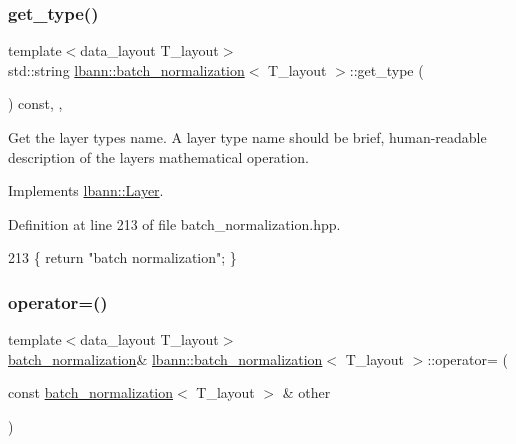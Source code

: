 \subsubsection{\texorpdfstring{get\+\_\+type()}{get\_type()}}
{\footnotesize\ttfamily template$<$data\+\_\+layout T\+\_\+layout$>$ \\
std\+::string \hyperlink{classlbann_1_1batch__normalization}{lbann\+::batch\+\_\+normalization}$<$ T\+\_\+layout $>$\+::get\+\_\+type (\begin{DoxyParamCaption}{ }\end{DoxyParamCaption}) const\hspace{0.3cm}{\ttfamily [inline]}, {\ttfamily [override]}, {\ttfamily [virtual]}}

Get the layer type\textquotesingle{}s name. A layer type name should be brief, human-\/readable description of the layer\textquotesingle{}s mathematical operation. 

Implements \hyperlink{classlbann_1_1Layer_a0fa0ea9160b490c151c0a17fde4f7239}{lbann\+::\+Layer}.



Definition at line 213 of file batch\+\_\+normalization.\+hpp.


\begin{DoxyCode}
213 \{ \textcolor{keywordflow}{return} \textcolor{stringliteral}{"batch normalization"}; \}
\end{DoxyCode}
\mbox{\label{classlbann_1_1batch__normalization_aeb3c03a8dd166a64a77a26ee06ba81cd}} 
\subsubsection{\texorpdfstring{operator=()}{operator=()}}
{\footnotesize\ttfamily template$<$data\+\_\+layout T\+\_\+layout$>$ \\
\hyperlink{classlbann_1_1batch__normalization}{batch\+\_\+normalization}\& \hyperlink{classlbann_1_1batch__normalization}{lbann\+::batch\+\_\+normalization}$<$ T\+\_\+layout $>$\+::operator= (\begin{DoxyParamCaption}\item[{const \hyperlink{classlbann_1_1batch__normalization}{batch\+\_\+normalization}$<$ T\+\_\+layout $>$ \&}]{other }\end{DoxyParamCaption})\hspace{0.3cm}{\ttfamily [inline]}}



